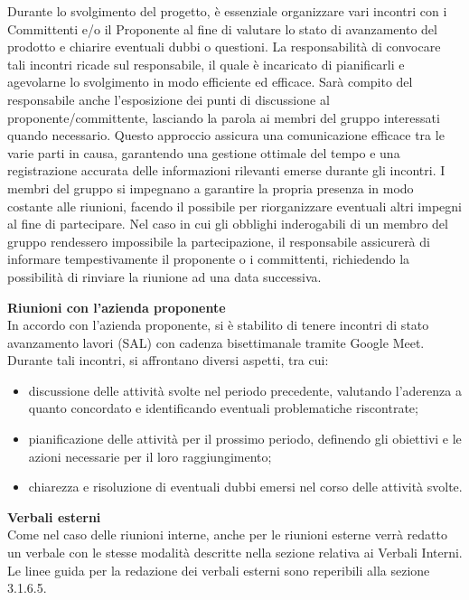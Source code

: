Durante lo svolgimento del progetto, è essenziale organizzare vari incontri con i Committenti e/o il Proponente al fine di valutare lo stato di avanzamento del prodotto e chiarire eventuali dubbi o questioni.
La responsabilità di convocare tali incontri ricade sul responsabile, il quale è incaricato di pianificarli e agevolarne lo svolgimento in modo efficiente ed efficace.
Sarà compito del responsabile anche l’esposizione dei punti di discussione al proponente/committente, lasciando la parola ai membri del gruppo interessati quando necessario. Questo approccio assicura una comunicazione efficace tra le varie parti in causa, garantendo una gestione ottimale del tempo e una registrazione accurata delle informazioni rilevanti emerse durante gli incontri.
I membri del gruppo si impegnano a garantire la propria presenza in modo costante alle riunioni, facendo il possibile per riorganizzare eventuali altri impegni al fine di partecipare. Nel caso in cui gli obblighi inderogabili di un membro del gruppo rendessero impossibile la partecipazione, il responsabile assicurerà di informare tempestivamente il proponente o i committenti, richiedendo la possibilità di rinviare la riunione ad una data successiva.

\textbf{Riunioni con l'azienda proponente}\\
In accordo con l’azienda proponente, si è stabilito di tenere incontri di stato avanzamento lavori (SAL) con cadenza bisettimanale tramite Google Meet.
Durante tali incontri, si affrontano diversi aspetti, tra cui:
\begin{itemize}
    \item discussione delle attività svolte nel periodo precedente, valutando l’aderenza a quanto concordato e identificando eventuali problematiche riscontrate;
    \item pianificazione delle attività per il prossimo periodo, definendo gli obiettivi e le azioni necessarie per il loro raggiungimento;
    \item chiarezza e risoluzione di eventuali dubbi emersi nel corso delle attività svolte.
\end{itemize}

\textbf{Verbali esterni}\\
Come nel caso delle riunioni interne, anche per le riunioni esterne verrà redatto un verbale con le stesse modalità descritte nella sezione relativa ai Verbali Interni.
Le linee guida per la redazione dei verbali esterni sono reperibili alla sezione 3.1.6.5.


